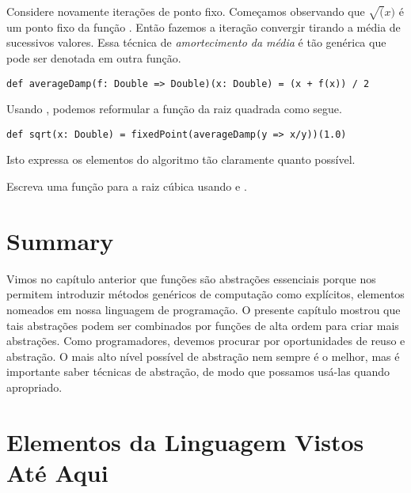 Considere novamente itera\c{c}\~{o}es de ponto fixo. Come\c{c}amos observando que 
$\sqrt(x)$ \'{e} um ponto fixo da fun\c{c}\~{a}o . Ent\~{a}o fazemos
a itera\c{c}\~{a}o convergir tirando a m\'{e}dia de sucessivos valores. Essa t\'{e}cnica
de {\em amortecimento da m\'{e}dia} \'{e} t\~{a}o gen\'{e}rica que pode ser denotada
em outra fun\c{c}\~{a}o.
\begin{lstlisting}
def averageDamp(f: Double => Double)(x: Double) = (x + f(x)) / 2
\end{lstlisting}
Usando , podemos reformular a fun\c{c}\~{a}o da raiz quadrada
como segue. 
\begin{lstlisting}
def sqrt(x: Double) = fixedPoint(averageDamp(y => x/y))(1.0)
\end{lstlisting}

Isto expressa os elementos do algoritmo t\~{a}o claramente quanto poss\'{i}vel.
\begin{exercise} 
Escreva uma fun\c{c}\~{a}o para a raiz c\'{u}bica usando  e .  
\end{exercise}

\section{Summary}

Vimos no cap\'{i}tulo anterior que fun\c{c}\~{o}es s\~{a}o abstra\c{c}\~{o}es essenciais porque 
nos permitem introduzir m\'{e}todos gen\'{e}ricos de computa\c{c}\~{a}o como expl\'{i}citos,
elementos nomeados em nossa linguagem de programa\c{c}\~{a}o. O presente cap\'{i}tulo
mostrou que tais abstra\c{c}\~{o}es podem ser combinados por fun\c{c}\~{o}es de alta ordem
para criar mais abstra\c{c}\~{o}es. Como programadores, devemos procurar por oportunidades 
de reuso e abstra\c{c}\~{a}o. O mais alto n\'{i}vel poss\'{i}vel de abstra\c{c}\~{a}o nem sempre \'{e} 
o melhor, mas \'{e} importante saber t\'{e}cnicas de abstra\c{c}\~{a}o, de modo que possamos
us\'{a}-las quando apropriado. 

\section{Elementos da Linguagem Vistos At\'{e} Aqui}

